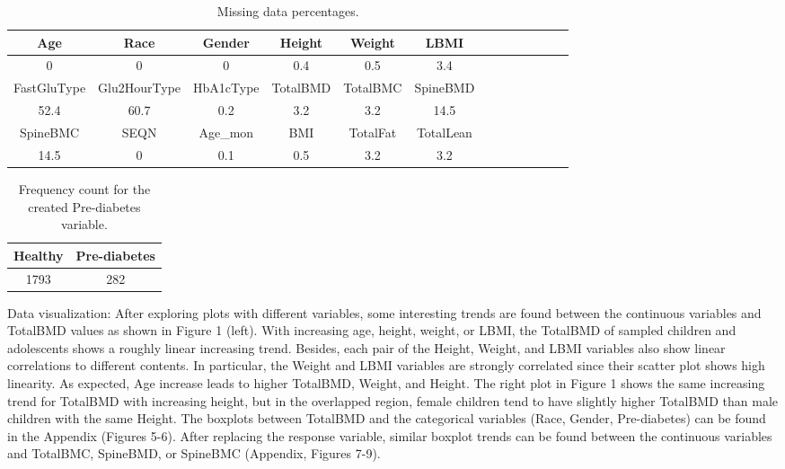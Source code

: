 \documentclass[11pt]{article}
\begin{document}
\begin{table}[ht]
\centering
\caption{ Missing data percentages.\label{data3}}
\begin{tabular}{|c|c|c|c|c|c|c|c|c|c|c|c|c|}\hline
Age& Race& Gender& Height& Weight& LBMI\\\hline
0& 0& 0& 0.4& 0.5& 3.4\\\hline
FastGluType& Glu2HourType& HbA1cType& TotalBMD& TotalBMC& SpineBMD\\\hline
52.4& 60.7& 0.2& 3.2& 3.2& 14.5\\\hline
SpineBMC& SEQN& Age\_mon& BMI& TotalFat&TotalLean\\\hline
14.5& 0& 0.1& 0.5& 3.2& 3.2\\\hline
\end{tabular}
\end{table}

\begin{table}[ht]
\centering
\caption{ Frequency count for the created Pre-diabetes variable.\label{data3}}
\begin{tabular}{|c|c|}\hline
Healthy &Pre-diabetes\\\hline
1793 &282\\\hline
\end{tabular}
\end{table}		

\medskip

Data visualization: After exploring plots with different variables, some interesting trends are found between the continuous variables and TotalBMD values as shown in Figure 1 (left). With increasing age, height, weight, or LBMI, the TotalBMD of sampled children and adolescents shows a roughly linear increasing trend. Besides, each pair of the Height, Weight, and LBMI variables also show linear correlations to different contents. In particular, the Weight and LBMI variables are strongly correlated since their scatter plot shows high linearity. As expected, Age increase leads to higher TotalBMD, Weight, and Height. The right plot in Figure 1 shows the same increasing trend for TotalBMD with increasing height, but in the overlapped region, female children tend to have slightly higher TotalBMD than male children with the same Height. The boxplots between TotalBMD and the categorical variables (Race, Gender, Pre-diabetes) can be found in the Appendix (Figures 5-6). After replacing the response variable, similar boxplot trends can be found between the continuous variables and TotalBMC, SpineBMD, or SpineBMC (Appendix, Figures 7-9).  
\end{document}
